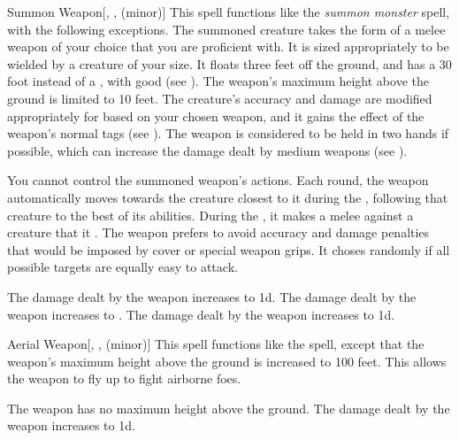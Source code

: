 \lowercase{\hypertarget{spell:Summon Weapon}{}}\label{spell:Summon Weapon}
\begin{freeability}[Rank 3]{\hypertarget{spell:Summon Weapon}{Summon Weapon}}[, ,  (minor)]
This spell functions like the \textit{summon monster} spell, with the following exceptions.
The summoned creature takes the form of a melee weapon of your choice that you are proficient with.
It is sized appropriately to be wielded by a creature of your size.
It floats three feet off the ground, and has a 30 foot  instead of a , with good  (see ).
The weapon's maximum height above the ground is limited to 10 feet.
The creature's accuracy and damage are modified appropriately for based on your chosen weapon, and it gains the effect of the weapon's normal tags (see ).
The weapon is considered to be held in two hands if possible, which can increase the damage dealt by medium weapons (see ).

You cannot control the summoned weapon's actions.
Each round, the weapon automatically moves towards the creature closest to it during the , following that creature to the best of its abilities.
During the , it makes a melee  against a creature that it .
The weapon prefers to avoid accuracy and damage penalties that would be imposed by cover or special weapon grips.
It choses randomly if all possible targets are equally easy to attack.

\rankline
{} The damage dealt by the weapon increases to  \minus1d.
 The damage dealt by the weapon increases to .
 The damage dealt by the weapon increases to  \plus1d.
\end{freeability}
\vspace{0.25em}



\lowercase{\hypertarget{spell:Aerial Weapon}{}}\label{spell:Aerial Weapon}
\begin{freeability}[Rank 4]{\hypertarget{spell:Aerial Weapon}{Aerial Weapon}}[, ,  (minor)]
This spell functions like the  spell, except that the weapon's maximum height above the ground is increased to 100 feet.
This allows the weapon to fly up to fight airborne foes.

\rankline
{} The weapon has no maximum height above the ground.
 The damage dealt by the weapon increases to  \minus1d.
\end{freeability}
\vspace{0.25em}



